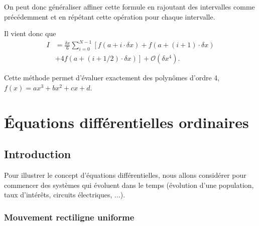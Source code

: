 \documentclass[a4paper,12pt]{book}
\begin{document}
On peut donc généraliser affiner cette formule en rajoutant des intervalles comme précédemment
et en répétant cette opération pour chaque intervalle.

Il vient donc que 
\begin{align}
 I&=\frac{\delta x}{6}\sum_{i=0}^{N-1}\left[f(a+i\cdot \delta x)+f(a+(i+1)\cdot\delta x)\right.\nonumber\\
 &\left.+4f(a+(i+1/2)\cdot\delta x)\right]+\mathcal{O}(\delta x^4).
\end{align}

Cette méthode permet d'évaluer exactement des polynômes d'ordre 4, $f(x)=ax^3+bx^2+cx+d$.


\chapter{Équations différentielles ordinaires}

\section{Introduction}

Pour illustrer le concept d'équations différentielles, nous allons considérer pour commencer des systèmes
qui évoluent dans le temps (évolution d'une population, taux d'intérêts, circuits électriques, ...).

\subsection{Mouvement rectiligne uniforme}
\end{document}
